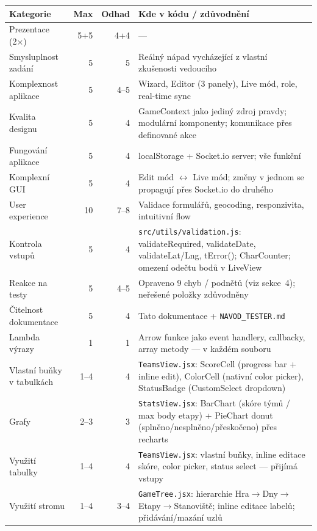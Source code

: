﻿\documentclass[a4paper,12pt]{article}
\begin{document}
\begin{longtable}{>{\raggedright}p{5.2cm} r r >{\raggedright\arraybackslash}p{5.8cm}}
  \toprule
  \textbf{Kategorie} & \textbf{Max} & \textbf{Odhad} & \textbf{Kde v kódu / zdůvodnění} \\
  \midrule
  \endhead
  Prezentace (2×) & 5+5 & 4+4 & — \\
  Smysluplnost zadání & 5 & 5 & Reálný nápad vycházející z vlastní zkušenosti vedoucího \\
  Komplexnost aplikace & 5 & 4--5 & Wizard, Editor (3 panely), Live mód, role, real-time sync \\
  Kvalita designu & 5 & 4 & GameContext jako jediný zdroj pravdy; modulární komponenty; komunikace přes definované akce \\
  Fungování aplikace & 5 & 4 & localStorage + Socket.io server; vše funkční \\
  Komplexní GUI & 5 & 4 & Edit mód $\leftrightarrow$ Live mód; změny v jednom se propagují přes Socket.io do druhého \\
  User experience & 10 & 7--8 & Validace formulářů, geocoding, responzivita, intuitivní flow \\
  Kontrola vstupů & 5 & 4 & \texttt{src/utils/validation.js}: validateRequired, validateDate, validateLat/Lng, tError(); CharCounter; omezení odečtu bodů v LiveView \\
  Reakce na testy & 5 & 4--5 & Opraveno 9 chyb / podnětů (viz sekce~4); neřešené položky zdůvodněny \\
  Čitelnost dokumentace & 5 & 4 & Tato dokumentace + \texttt{NAVOD\_TESTER.md} \\
  \midrule
  Lambda výrazy & 1 & 1 & Arrow funkce jako event handlery, callbacky, array metody — v každém souboru \\
  Vlastní buňky v tabulkách & 1--4 & 4 & \texttt{TeamsView.jsx}: ScoreCell (progress bar + inline edit), ColorCell (nativní color picker), StatusBadge (CustomSelect dropdown) \\
  Grafy & 2--3 & 3 & \texttt{StatsView.jsx}: BarChart (skóre týmů / max body etapy) + PieChart donut (splněno/nesplněno/přeskočeno) přes recharts \\
  Využití tabulky & 1--4 & 4 & \texttt{TeamsView.jsx}: vlastní buňky, inline editace skóre, color picker, status select — přijímá vstupy \\
  Využití stromu & 1--4 & 3--4 & \texttt{GameTree.jsx}: hierarchie Hra$\rightarrow$Dny$\rightarrow$Etapy$\rightarrow$Stanoviště; inline editace labelů; přidávání/mazání uzlů \\

\end{longtable}
\end{document}
